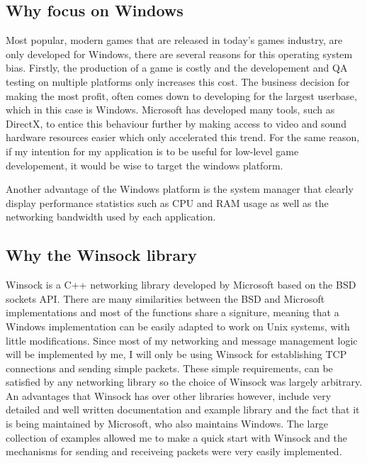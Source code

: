 \subsection{Why focus on Windows}
Most popular, modern games that are released in today's games industry, are only developed for Windows, there are several reasons for this operating system bias. Firstly, the production of a game is costly and the developement and QA testing on multiple platforms only increases this cost. The business decision for making the most profit, often comes down to developing for the largest userbase, which in this case is Windows. Microsoft has developed many tools, such as DirectX, to entice this behaviour further by making access to video and sound hardware resources easier which only accelerated this trend.
For the same reason, if my intention for my application is to be useful for low-level game developement, it would be wise to target the windows platform.

Another advantage of the Windows platform is the system manager that clearly display performance statistics such as CPU and RAM usage as well as the networking bandwidth used by each application.


\subsection{Why the Winsock library}
Winsock is a C++ networking library developed by Microsoft based on the BSD sockets API. There are many similarities between the BSD and Microsoft implementations and most of the functions share a signiture, meaning that a Windows implementation can be easily adapted to work on Unix systems, with little modifications. Since most of my networking and message management logic will be implemented by me, I will only be using Winsock for establishing TCP connections and sending simple packets. These simple requirements, can be satisfied by any networking library so the choice of Winsock was largely arbitrary. An advantages that Winsock has over other libraries however, include very detailed and well written documentation and example library and the fact that it is being maintained by Microsoft, who also maintains Windows. The large collection of examples allowed me to make a quick start with Winsock and the mechanisms for sending and receiveing packets were very easily implemented.


\newpage
